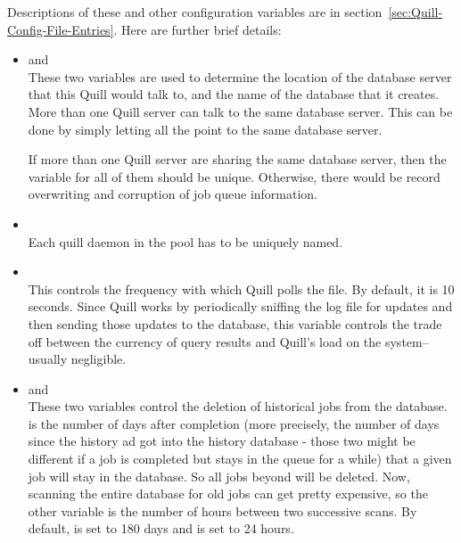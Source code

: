 Descriptions of these and other configuration variables are in
section~\ref{sec:Quill-Config-File-Entries}.
Here are further brief details:

\begin{itemize}

\item {} and \\
These two variables are used to determine the location of the database
server that this Quill would talk to, and the name of the database that
it creates.  More than one Quill server can talk to the same database
server.  This can be done by simply letting all the 
 point to the same database server.

If more than one Quill server are sharing the same database
server, then the  variable for all of them should
be unique.  Otherwise, there would be record overwriting and corruption
of job queue information.

\item {}\\
Each quill daemon in the pool has to be uniquely named.

\item {}\\
This controls the frequency with which Quill polls the
 file.  By default, it is 10 seconds.  Since Quill
works by periodically sniffing the log file for updates and then sending
those updates to the database, this variable controls the trade off between
the currency of query results and Quill's load on the system--usually
negligible.

\item {} and 
		\\
These two variables control the deletion of historical jobs from the
database.   is the number of days
after completion (more precisely, the number of days since the history ad got 
into the history database - those two might be different if a job is completed 
but stays in the queue for a while) that a given job will stay in the database.  
So all jobs beyond  will be deleted.  Now,
scanning the entire database for old jobs can get pretty expensive,
so the other variable 
is the number of hours between two successive scans.  By default,
 is set to 180 days and
 is set to 24 hours.


\end{itemize}
